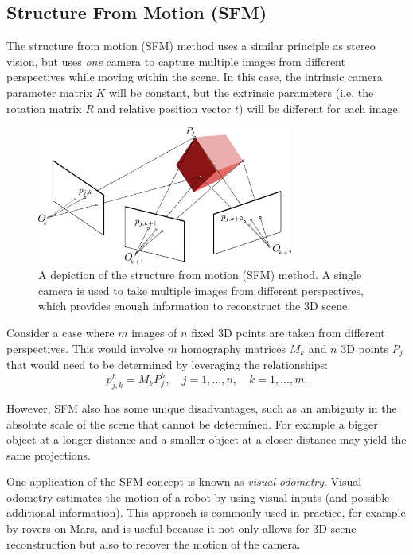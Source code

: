 \subsection{Structure From Motion (SFM)}
The structure from motion (SFM) method uses a similar principle as stereo vision, but uses \textit{one} camera to capture multiple images from different perspectives while moving within the scene. In this case, the intrinsic camera parameter matrix $K$ will be constant, but the extrinsic parameters (i.e. the rotation matrix $R$ and relative position vector $t$) will be different for each image.
\begin{figure}[ht]
  \begin{center}
	\includegraphics[width=0.75\textwidth]{tex/figs/ch09_figs/sfm.png}  \end{center}
  \caption{A depiction of the structure from motion (SFM) method. A single camera is used to take multiple images from different perspectives, which provides enough information to reconstruct the 3D scene.}
  \label{sfm}
\end{figure}
Consider a case where $m$ images of $n$ fixed 3D points are taken from different perspectives. This would involve $m$ homography matrices $M_k$ and $n$ 3D points $P_j$ that would need to be determined by leveraging the relationships:
\begin{equation*}
    p_{j,k}^h = M_k P^h_j, \quad j = 1,\dots,n, \quad k=1,\dots,m.
\end{equation*}

However, SFM also has some unique disadvantages, such as an ambiguity in the absolute scale of the scene that cannot be determined. For example a bigger object at a longer distance and a smaller object at a closer distance may yield the same projections.

One application of the SFM concept is known as \textit{visual odometry}. Visual odometry estimates the motion of a robot by using visual inputs (and possible additional information). This approach is commonly used in practice, for example by rovers on Mars, and is useful because it not only allows for 3D scene reconstruction but also to recover the motion of the camera.
